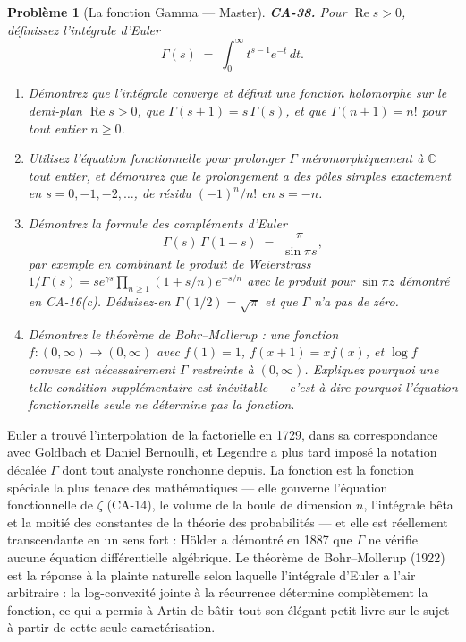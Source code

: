 \documentclass[11pt]{article}
\newtheorem{problem}{Problème}
\begin{document}
\begin{problem}[{La fonction Gamma --- Master}]
\textbf{CA-38.} Pour $ \operatorname{Re} s > 0 $, définissez l'intégrale d'Euler
\[ \Gamma(s) \;=\; \int_0^{\infty} t^{s-1} e^{-t}\, dt . \]
\begin{enumerate}
\item[(a)] Démontrez que l'intégrale converge et définit une fonction holomorphe sur le demi-plan
$ \operatorname{Re} s > 0 $, que $ \Gamma(s + 1) = s\,\Gamma(s) $, et que
$ \Gamma(n + 1) = n! $ pour tout entier $ n \ge 0 $.
\item[(b)] Utilisez l'équation fonctionnelle pour prolonger $ \Gamma $ méromorphiquement à
$ \mathbb{C} $ tout entier, et démontrez que le prolongement a des pôles simples exactement en
$ s = 0, -1, -2, \dots $, de résidu $ (-1)^n/n! $ en $ s = -n $.
\item[(c)] Démontrez la formule des compléments d'Euler
\[ \Gamma(s)\,\Gamma(1 - s) \;=\; \frac{\pi}{\sin \pi s} , \]
par exemple en combinant le produit de Weierstrass
$ 1/\Gamma(s) = s e^{\gamma s} \prod_{n \ge 1} (1 + s/n)e^{-s/n} $ avec le produit pour
$ \sin \pi z $ démontré en CA-16(c). Déduisez-en $ \Gamma(1/2) = \sqrt{\pi} $ et que
$ \Gamma $ n'a pas de zéro.
\item[(d)] Démontrez le théorème de Bohr--Mollerup : une fonction $ f : (0, \infty) \to (0, \infty) $ avec
$ f(1) = 1 $, $ f(x+1) = x f(x) $, et $ \log f $ convexe est nécessairement $ \Gamma $
restreinte à $ (0, \infty) $. Expliquez pourquoi une telle condition supplémentaire est
inévitable --- c'est-à-dire pourquoi l'équation fonctionnelle seule ne détermine pas la fonction.
\end{enumerate}

\end{problem}

\noindent Euler a trouvé l'interpolation de la factorielle en 1729, dans sa correspondance
avec Goldbach et Daniel Bernoulli, et Legendre a plus tard imposé la notation décalée $ \Gamma $
dont tout analyste ronchonne depuis. La fonction est la fonction spéciale la plus tenace des
mathématiques --- elle gouverne l'équation fonctionnelle de $ \zeta $ (CA-14), le volume de la boule
de dimension $ n $, l'intégrale bêta et la moitié des constantes de la théorie des probabilités ---
et elle est réellement transcendante en un sens fort : Hölder a démontré en 1887 que $ \Gamma $ ne
vérifie aucune équation différentielle algébrique. Le théorème de Bohr--Mollerup (1922) est la
réponse à la plainte naturelle selon laquelle l'intégrale d'Euler a l'air arbitraire : la
log-convexité jointe à la récurrence détermine complètement la fonction, ce qui a permis à Artin de
bâtir tout son élégant petit livre sur le sujet à partir de cette seule caractérisation.
\end{document}
